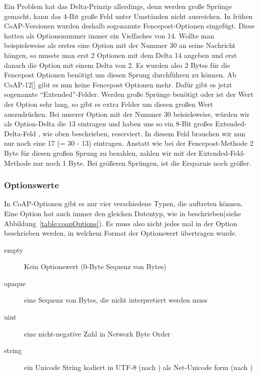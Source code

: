 Ein Problem hat das Delta-Prinzip allerdings, denn werden große Sprünge gemacht, kann das 4-Bit
große Feld unter Umständen nicht ausreichen.
In frühen \ac{CoAP}-Versionen wurden deshalb sogenannte Fencepost-Optionen eingefügt.
Diese hatten als Optionsnummer immer ein Vielfaches von 14.
Wollte man beispielsweise als erstes eine Option mit der Nummer 30 an seine Nachricht hängen, so
musste man erst 2 Optionen mit dem Delta 14 angeben und erst danach die Option mit einem Delta von
2.
Es wurden also 2 Bytes für die Fencepost Optionen benötigt um diesen Sprung durchführen zu können.
Ab CoAP-12[\cite{draft-ietf-core-coap-12}] gibt es nun keine Fencepost Optionen mehr.
Dafür gibt es jetzt sogenannte "`Extended"'-Felder.
Werden große Sprünge benötigt oder ist der Wert der Option sehr lang, so gibt es extra Felder um
diesen großen Wert auszudrücken.
Bei unserer Option mit der Nummer 30 beisielsweise, würden wir als Option-Delta die 13 eintragen und
haben uns so ein 8-Bit großes Extended-Delta-Feld , wie oben beschrieben, reserviert.
In diesem Feld brauchen wir nun nur noch eine 17 (= 30 - 13) eintragen.
Anstatt wie bei der Fencepost-Methode 2 Byte für diesen großen Sprung zu bezahlen, zahlen wir mit
der Extended-Feld-Methode nur noch 1 Byte.
Bei größeren Sprüngen, ist die Ersparnis noch größer.

\subsubsection{Optionswerte}
In \ac{CoAP}-Optionen gibt es nur vier verschiedene Typen, die auftreten können.
Eine Option hat auch immer den gleichen Datentyp, wie in \cite{draft-ietf-core-coap-13} beschrieben(siehe Abbildung~\ref{table:coapOptions}).
Es muss also nicht jedes mal in der Option beschrieben werden, in welchem Format der Optionswert übertragen wurde.
\begin{description}
\item[empty] Kein Optionswert (0-Byte Sequenz von Bytes)
\item[opaque] eine Sequenz von Bytes, die nicht interpretiert werden muss
\item[uint] eine nicht-negative Zahl in Network Byte Order
\item[string] ein Unicode String kodiert in \ac{UTF-8} (nach \cite{rfc3629}) als Net-Unicode form (nach \cite{rfc5198})
\end{description} 